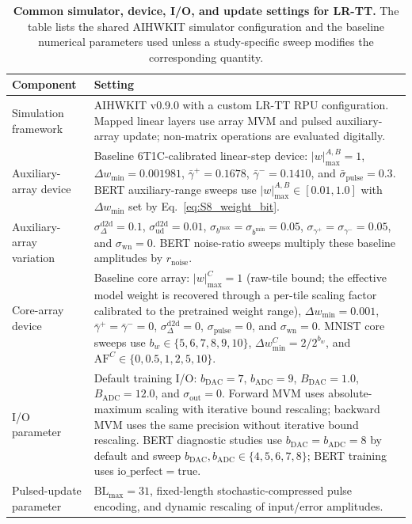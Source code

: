 \documentclass[AMA,LATO1COL]{WileyNJDv5}
\begin{document}
\begin{table}[!htbp]
\centering
\caption{\textbf{Common simulator, device, I/O, and update settings for LR-TT.}
The table lists the shared AIHWKIT simulator configuration and the baseline numerical parameters used unless a study-specific sweep modifies the corresponding quantity.}
\label{tab:S8_hardware_simulator}
\small
\renewcommand{\arraystretch}{1.10}
\setlength{\tabcolsep}{4.0pt}
\begin{tabularx}{\linewidth}{p{3.0cm}Y}
\toprule
{}
\textbf{Component} & \textbf{Setting} \\
\midrule
Simulation framework &
AIHWKIT v0.9.0 with a custom LR-TT RPU configuration. Mapped linear layers use array MVM and pulsed auxiliary-array update; non-matrix operations are evaluated digitally. \\
\midrule
Auxiliary-array device &
Baseline 6T1C-calibrated linear-step device: \(|w|_{\max}^{A,B}=1\), \(\Delta w_{\min}=0.001981\), \(\bar{\gamma}^{+}=0.1678\), \(\bar{\gamma}^{-}=0.1410\), and \(\bar{\sigma}_{\mathrm{pulse}}=0.3\). BERT auxiliary-range sweeps use \(|w|_{\max}^{A,B}\in[0.01,1.0]\) with \(\Delta w_{\min}\) set by Eq.~\eqref{eq:S8_weight_bit}. \\
\midrule
Auxiliary-array variation &
\(\sigma_{\Delta}^{\mathrm{d2d}}=0.1\), \(\sigma_{\mathrm{ud}}^{\mathrm{d2d}}=0.01\), \(\sigma_{b^{\max}}=\sigma_{b^{\min}}=0.05\), \(\sigma_{\gamma^{+}}=\sigma_{\gamma^{-}}=0.05\), and \(\sigma_{\mathrm{wn}}=0\). BERT noise-ratio sweeps multiply these baseline amplitudes by \(r_{\mathrm{noise}}\). \\
\midrule
Core-array device &
Baseline core array: \(|w|_{\max}^{C}=1\) (raw-tile bound; the effective model weight is recovered through a per-tile scaling factor calibrated to the pretrained weight range), \(\Delta w_{\min}=0.001\), \(\bar{\gamma}^{+}=\bar{\gamma}^{-}=0\), \(\sigma_{\Delta}^{\mathrm{d2d}}=0\), \(\sigma_{\mathrm{pulse}}=0\), and \(\sigma_{\mathrm{wn}}=0\). MNIST core sweeps use \(b_w\in\{5,6,7,8,9,10\}\), \(\Delta w_{\min}^{C}=2/2^{b_w}\), and \(\mathrm{AF}^{C}\in\{0,0.5,1,2,5,10\}\). \\
\midrule
I/O parameter &
Default training I/O: \(b_{\mathrm{DAC}}=7\), \(b_{\mathrm{ADC}}=9\), \(B_{\mathrm{DAC}}=1.0\), \(B_{\mathrm{ADC}}=12.0\), and \(\sigma_{\mathrm{out}}=0\). Forward MVM uses absolute-maximum scaling with iterative bound rescaling; backward MVM uses the same precision without iterative bound rescaling. BERT diagnostic studies use \(b_{\mathrm{DAC}}=b_{\mathrm{ADC}}=8\) by default and sweep \(b_{\mathrm{DAC}},b_{\mathrm{ADC}}\in\{4,5,6,7,8\}\); BERT training uses \(\mathrm{io\_perfect}=\mathrm{true}\). \\
\midrule
Pulsed-update parameter &
\(\mathrm{BL}_{\max}=31\), fixed-length stochastic-compressed pulse encoding, and dynamic rescaling of input/error amplitudes. \\
\bottomrule
\end{tabularx}
\end{table}
\FloatBarrier
\end{document}
